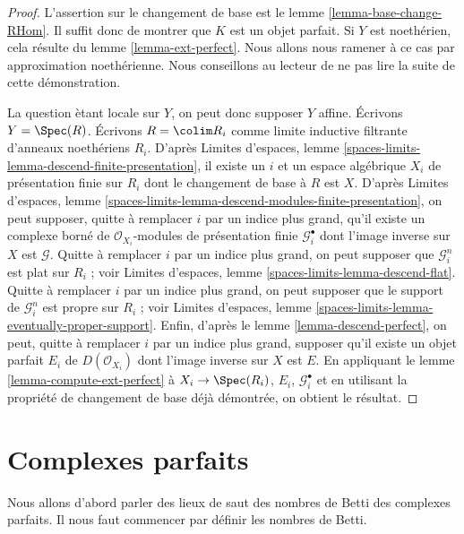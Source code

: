 \begin{proof}
L'assertion sur le changement de base est le lemme \ref{lemma-base-change-RHom}.
Il suffit donc de montrer que $K$ est un objet parfait. Si $Y$ est
noeth\'erien, cela r\'esulte du lemme \ref{lemma-ext-perfect}.
Nous allons nous ramener \`a ce cas par approximation noeth\'erienne.
Nous conseillons au lecteur de ne pas lire la suite de cette d\'emonstration.

\medskip\noindent
La question \`etant locale sur $Y$, on peut donc supposer $Y$ affine.
Écrivons $Y = \Spec(R)$. Écrivons $R = \colim R_i$ comme limite inductive
filtrante d'anneaux noeth\'eriens $R_i$. D'apr\`es Limites d'espaces, lemme
\ref{spaces-limits-lemma-descend-finite-presentation},
il existe un $i$ et un espace alg\'ebrique $X_i$ de pr\'esentation finie
sur $R_i$ dont le changement de base \`a $R$ est $X$. D'apr\`es
Limites d'espaces, lemme
\ref{spaces-limits-lemma-descend-modules-finite-presentation},
on peut supposer, quitte \`a remplacer $i$ par un indice plus grand,
qu'il existe un complexe born\'e de $\mathcal{O}_{X_i}$-modules de pr\'esentation
finie $\mathcal{G}_i^\bullet$ dont
l'image inverse sur $X$ est $\mathcal{G}$. Quitte \`a remplacer $i$
par un indice plus grand,
on peut supposer que $\mathcal{G}_i^n$ est plat sur $R_i$ ; voir
Limites d'espaces, lemme
\ref{spaces-limits-lemma-descend-flat}.
Quitte \`a remplacer $i$ par un indice plus grand, on peut supposer que
le support de $\mathcal{G}_i^n$ est propre sur $R_i$ ; voir
Limites d'espaces, lemme \ref{spaces-limits-lemma-eventually-proper-support}.
Enfin, d'apr\`es le lemme \ref{lemma-descend-perfect},
on peut, quitte \`a remplacer $i$ par un indice plus grand, supposer qu'il
existe un objet parfait $E_i$ de $D(\mathcal{O}_{X_i})$ dont l'image inverse
sur $X$ est $E$. En appliquant le lemme \ref{lemma-compute-ext-perfect}
\`a $X_i \to \Spec(R_i)$, $E_i$, $\mathcal{G}_i^\bullet$ et en utilisant la
propri\'et\'e de changement de base d\'ej\`a d\'emontr\'ee, on obtient le r\'esultat.
\end{proof}







\section{Complexes parfaits}
\label{section-perfect-complexes}

\noindent
Nous allons d'abord parler des lieux de saut des nombres de Betti des complexes
parfaits. Il nous faut commencer par d\'efinir les nombres de Betti.

